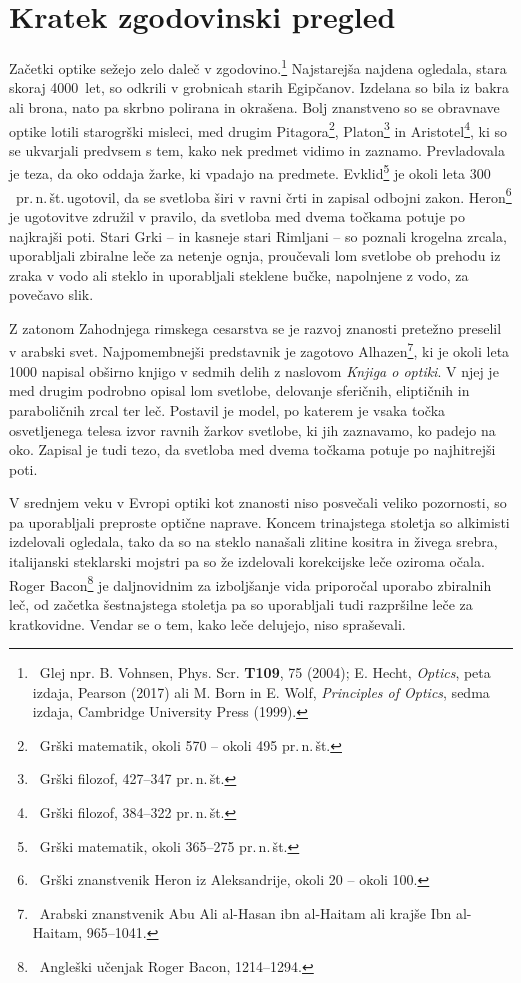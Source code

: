 \section{Kratek zgodovinski pregled}
Začetki optike sežejo zelo daleč v zgodovino.\footnote{~Glej 
npr. B. Vohnsen, Phys. Scr. {\bf T109}, 75 (2004); 
E. Hecht, {\it Optics}, peta izdaja, Pearson (2017) ali
M. Born in E. Wolf, {\it Principles of Optics}, sedma izdaja, 
Cambridge University Press (1999).} Najstarejša najdena ogledala, 
stara skoraj 4000~let, so odkrili v grobnicah starih Egipčanov. 
Izdelana so bila iz bakra ali brona, nato pa skrbno polirana in okrašena. 
Bolj znanstveno so se obravnave optike lotili starogrški
misleci, med drugim Pitagora\footnote{~Grški 
matematik, okoli 570 -- okoli 495 pr.\,n.\,št.}, Platon\footnote{~Grški 
filozof, 427--347 pr.\,n.\,št.} in Aristotel\footnote{~Grški 
filozof, 384--322 pr.\,n.\,št.}, ki so se 
ukvarjali predvsem s tem, kako nek predmet vidimo in zaznamo. Prevladovala
je teza, da oko oddaja žarke, ki vpadajo na predmete.
Evklid\footnote{~Grški 
matematik, okoli 365--275 pr.\,n.\,št.} je okoli leta $300$~pr.\,n.\,št.\,ugotovil, 
da se svetloba širi v ravni črti in zapisal odbojni zakon. Heron\footnote{~Grški 
znanstvenik Heron iz Aleksandrije, okoli 20 -- okoli 100.} je ugotovitve združil
v pravilo, da svetloba med dvema točkama potuje po najkrajši poti.
Stari Grki -- in kasneje stari Rimljani -- so poznali krogelna zrcala, 
uporabljali zbiralne leče za netenje ognja, 
proučevali lom svetlobe ob prehodu iz zraka v vodo ali steklo
in uporabljali steklene bučke, napolnjene z vodo, za povečavo slik.

Z zatonom Zahodnjega rimskega cesarstva se je razvoj znanosti pretežno 
preselil v arabski svet. Najpomembnejši predstavnik je zagotovo 
Alhazen\footnote{~Arabski znanstvenik Abu 
Ali al-Hasan ibn al-Haitam ali krajše Ibn al-Haitam, 965--1041.}, 
ki je okoli leta 1000 napisal obširno knjigo v sedmih delih
z naslovom {\it Knjiga o optiki}. 
V njej je med drugim podrobno opisal lom svetlobe, delovanje sferičnih,
eliptičnih in paraboličnih zrcal ter leč. Postavil je model, 
po katerem je vsaka točka osvetljenega telesa izvor
ravnih žarkov svetlobe, ki jih zaznavamo, ko padejo na oko. 
Zapisal je tudi tezo, da svetloba med dvema točkama potuje po najhitrejši poti.

V srednjem veku v Evropi optiki kot znanosti niso posvečali veliko
pozornosti, so pa uporabljali preproste optične naprave. 
Koncem trinajstega stoletja so alkimisti izdelovali ogledala, 
tako da so na steklo nanašali zlitine kositra in živega srebra, 
italijanski steklarski mojstri pa so že izdelovali korekcijske leče 
oziroma očala. Roger Bacon\footnote{~Angleški učenjak Roger Bacon, 1214--1294.}
je daljnovidnim za izboljšanje vida priporočal uporabo zbiralnih leč, 
od začetka šestnajstega stoletja pa so uporabljali tudi razpršilne leče
za kratkovidne. Vendar se o tem, kako leče delujejo, niso spraševali. 

